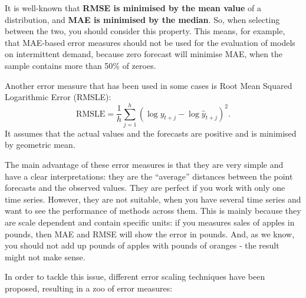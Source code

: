 \documentclass[
]{book}
\theoremstyle{definition}
\theoremstyle{definition}
\theoremstyle{definition}
\theoremstyle{definition}
\theoremstyle{remark}
\begin{document}
It is well-known \citep[see, for example,][]{Kolassa2016} that \textbf{RMSE is minimised by the mean value} of a distribution, and \textbf{MAE is minimised by the median}. So, when selecting between the two, you should consider this property. This means, for example, that MAE-based error measures should not be used for the evaluation of models on intermittent demand, because zero forecast will minimise MAE, when the sample contains more than 50\% of zeroes.

Another error measure that has been used in some cases is Root Mean Squared Logarithmic Error (RMSLE):
\begin{equation}
    \mathrm{RMSLE} = \frac{1}{h} \sum_{j=1}^h \left( \log y_{t+j} - \log \hat{y}_{t+j} \right)^2 .
    \label{eq:RMSLE}
\end{equation}
It assumes that the actual values and the forecasts are positive and is minimised by geometric mean.

The main advantage of these error measures is that they are very simple and have a clear interpretations: they are the ``average'' distances between the point forecasts and the observed values. They are perfect if you work with only one time series. However, they are not suitable, when you have several time series and want to see the performance of methods across them. This is mainly because they are scale dependent and contain specific units: if you measures sales of apples in pounds, then MAE and RMSE will show the error in pounds. And, as we know, you should not add up pounds of apples with pounds of oranges - the result might not make sense.

In order to tackle this issue, different error scaling techniques have been proposed, resulting in a zoo of error measures:
\end{document}
